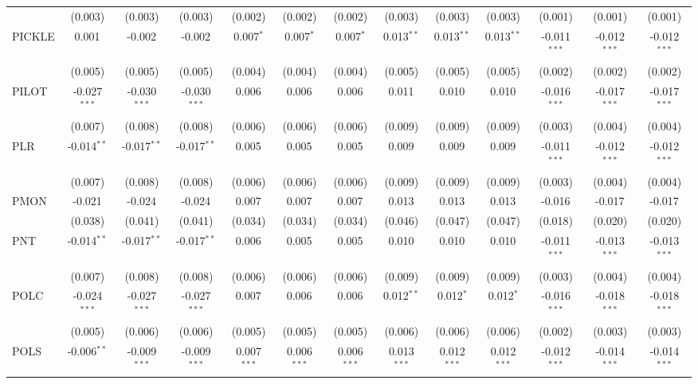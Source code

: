 \begin{table}[!htbp]
\begin{tabular}{@{\extracolsep{5pt}}lcccccccccccc}
  & (0.003) & (0.003) & (0.003) & (0.002) & (0.002) & (0.002) & (0.003) & (0.003) & (0.003) & (0.001) & (0.001) & (0.001) \\
 PICKLE & 0.001$^{}$ & -0.002$^{}$ & -0.002$^{}$ & 0.007$^{*}$ & 0.007$^{*}$ & 0.007$^{*}$ & 0.013$^{**}$ & 0.013$^{**}$ & 0.013$^{**}$ & -0.011$^{***}$ & -0.012$^{***}$ & -0.012$^{***}$ \\
  & (0.005) & (0.005) & (0.005) & (0.004) & (0.004) & (0.004) & (0.005) & (0.005) & (0.005) & (0.002) & (0.002) & (0.002) \\
 PILOT & -0.027$^{***}$ & -0.030$^{***}$ & -0.030$^{***}$ & 0.006$^{}$ & 0.006$^{}$ & 0.006$^{}$ & 0.011$^{}$ & 0.010$^{}$ & 0.010$^{}$ & -0.016$^{***}$ & -0.017$^{***}$ & -0.017$^{***}$ \\
  & (0.007) & (0.008) & (0.008) & (0.006) & (0.006) & (0.006) & (0.009) & (0.009) & (0.009) & (0.003) & (0.004) & (0.004) \\
 PLR & -0.014$^{**}$ & -0.017$^{**}$ & -0.017$^{**}$ & 0.005$^{}$ & 0.005$^{}$ & 0.005$^{}$ & 0.009$^{}$ & 0.009$^{}$ & 0.009$^{}$ & -0.011$^{***}$ & -0.012$^{***}$ & -0.012$^{***}$ \\
  & (0.007) & (0.008) & (0.008) & (0.006) & (0.006) & (0.006) & (0.009) & (0.009) & (0.009) & (0.003) & (0.004) & (0.004) \\
 PMON & -0.021$^{}$ & -0.024$^{}$ & -0.024$^{}$ & 0.007$^{}$ & 0.007$^{}$ & 0.007$^{}$ & 0.013$^{}$ & 0.013$^{}$ & 0.013$^{}$ & -0.016$^{}$ & -0.017$^{}$ & -0.017$^{}$ \\
  & (0.038) & (0.041) & (0.041) & (0.034) & (0.034) & (0.034) & (0.046) & (0.047) & (0.047) & (0.018) & (0.020) & (0.020) \\
 PNT & -0.014$^{**}$ & -0.017$^{**}$ & -0.017$^{**}$ & 0.006$^{}$ & 0.005$^{}$ & 0.005$^{}$ & 0.010$^{}$ & 0.010$^{}$ & 0.010$^{}$ & -0.011$^{***}$ & -0.013$^{***}$ & -0.013$^{***}$ \\
  & (0.007) & (0.008) & (0.008) & (0.006) & (0.006) & (0.006) & (0.009) & (0.009) & (0.009) & (0.003) & (0.004) & (0.004) \\
 POLC & -0.024$^{***}$ & -0.027$^{***}$ & -0.027$^{***}$ & 0.007$^{}$ & 0.006$^{}$ & 0.006$^{}$ & 0.012$^{**}$ & 0.012$^{*}$ & 0.012$^{*}$ & -0.016$^{***}$ & -0.018$^{***}$ & -0.018$^{***}$ \\
  & (0.005) & (0.006) & (0.006) & (0.005) & (0.005) & (0.005) & (0.006) & (0.006) & (0.006) & (0.002) & (0.003) & (0.003) \\
 POLS & -0.006$^{**}$ & -0.009$^{***}$ & -0.009$^{***}$ & 0.007$^{***}$ & 0.006$^{***}$ & 0.006$^{***}$ & 0.013$^{***}$ & 0.012$^{***}$ & 0.012$^{***}$ & -0.012$^{***}$ & -0.014$^{***}$ & -0.014$^{***}$ \\

\end{tabular}
\end{table}
